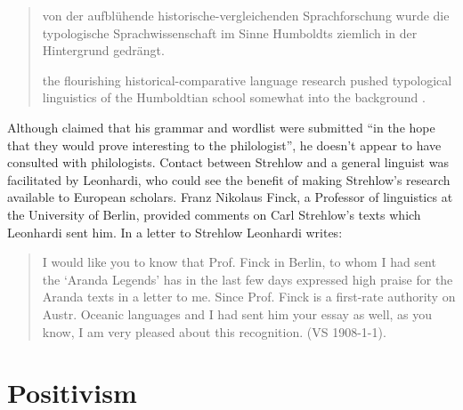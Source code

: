 \documentclass[output=paper]{langsci/langscibook}
\begin{document}
\begin{quote}
    von der aufblühende historische-vergleichenden Sprachforschung wurde die typologische Sprachwissenschaft im Sinne Humboldts ziemlich in der Hintergrund gedrängt. 
    
    the flourishing historical-comparative language research pushed typological linguistics of the Humboldtian school somewhat into the background \citep[216]{deeters_vergleichende_1937}.  
\end{quote}

Although \citet[1]{kempe_grammar_1891} claimed that his grammar and wordlist were submitted ``in the hope that they would prove interesting to the philologist'', he doesn’t appear to have consulted with philologists. Contact between Strehlow and a general linguist was facilitated by Leonhardi, who could see the benefit of making Strehlow’s research available to European scholars. Franz Nikolaus Finck, a Professor of linguistics at the University of Berlin, provided comments on Carl Strehlow’s texts which Leonhardi sent him. In a letter to Strehlow Leonhardi writes: 

\begin{quote}
    I would like you to know that Prof. Finck in Berlin, to whom I had sent the ‘Aranda Legends’ has in the last few days expressed high praise for the Aranda texts in a letter to me. Since Prof. Finck is a first-rate authority on Austr. Oceanic languages and I had sent him your essay as well, as you know, I am very pleased about this recognition.  (VS 1908-1-1).
\end{quote}

\section{Positivism} 
\end{document}
